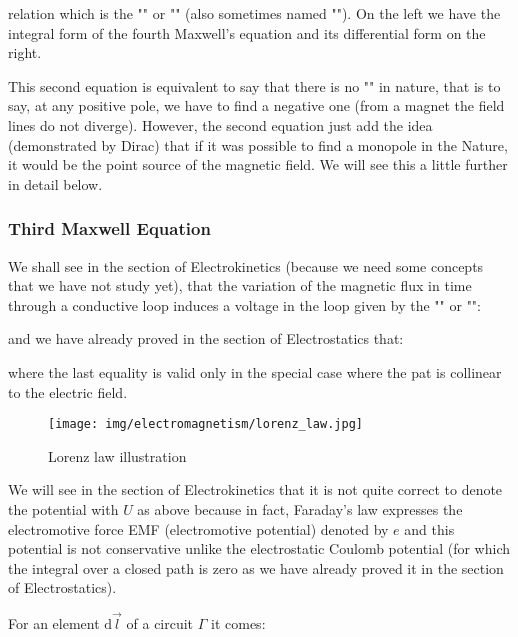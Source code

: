 	relation which is the "" or "\label{gauss law for magnetism}" (also sometimes named ""). On the left we have the integral form of the fourth Maxwell's equation and its differential form on the right.
	
	This second equation is equivalent to say that there is no "" in nature, that is to say, at any positive pole, we have to find a negative one (from a magnet the field lines do not diverge). However, the second equation just add the idea (demonstrated by Dirac) that if it was possible to find a monopole in the Nature, it would be the point source of the magnetic field. We will see this a little further in detail below.
	
	\subsubsection{Third Maxwell Equation}\label{third maxwell equation}
	We shall see in the section of Electrokinetics (because we need some concepts that we have not study yet), that the variation of the magnetic flux in time through a conductive loop induces a voltage in the loop given by the "" or "":
	
	and we have already proved in the section of Electrostatics that:
	
	where the last equality is valid only in the special case where the pat is collinear to the electric field.
	\begin{figure}[H]
		\centering
		\texttt{[image: img/electromagnetism/lorenz\_law.jpg]}
		\caption{Lorenz law illustration}
	\end{figure}
	\begin{tcolorbox}[title=Remark,colframe=black,arc=10pt]
	We will see in the section of Electrokinetics that it is not quite correct to denote the potential with $U$ as above because in fact, Faraday's law expresses the electromotive force EMF (electromotive potential) denoted by $e$ and this potential is not conservative unlike the electrostatic Coulomb potential (for which the integral over a closed path is zero as we have already proved it in the section of Electrostatics).
	\end{tcolorbox}
	For an element $\mathrm{d}\vec{l}$ of a circuit $\Gamma$ it comes:
	
